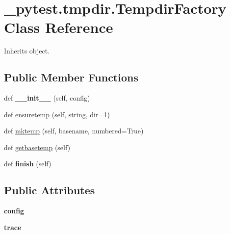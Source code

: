 \hypertarget{class__pytest_1_1tmpdir_1_1_tempdir_factory}{}\section{\+\_\+pytest.\+tmpdir.\+Tempdir\+Factory Class Reference}
\label{class__pytest_1_1tmpdir_1_1_tempdir_factory}


Inherits object.

\subsection*{Public Member Functions}
\begin{DoxyCompactItemize}
\item 
\mbox{\label{class__pytest_1_1tmpdir_1_1_tempdir_factory_a5f6438e7e6797e5c3f87ac2629295174}} 
def {\bfseries \+\_\+\+\_\+init\+\_\+\+\_\+} (self, config)
\item 
def \hyperlink{class__pytest_1_1tmpdir_1_1_tempdir_factory_aa7de55caeecdc6dafeba3bfa130df7b6}{ensuretemp} (self, string, dir=1)
\item 
def \hyperlink{class__pytest_1_1tmpdir_1_1_tempdir_factory_a3a41e666a0a7da2e5d90f110971e0090}{mktemp} (self, basename, numbered=True)
\item 
def \hyperlink{class__pytest_1_1tmpdir_1_1_tempdir_factory_adb19657479e448f3661212cf73f0d9ac}{getbasetemp} (self)
\item 
\mbox{\label{class__pytest_1_1tmpdir_1_1_tempdir_factory_ac9b5da486733de211baf94b71bd29d56}} 
def {\bfseries finish} (self)
\end{DoxyCompactItemize}
\subsection*{Public Attributes}
\begin{DoxyCompactItemize}
\item 
\mbox{\label{class__pytest_1_1tmpdir_1_1_tempdir_factory_a61619d60d3cc5bb0035ee974975655e4}} 
{\bfseries config}
\item 
\mbox{\label{class__pytest_1_1tmpdir_1_1_tempdir_factory_a607a4a7e62e0791697aca0a1ee0af88a}} 
{\bfseries trace}
\end{DoxyCompactItemize}


